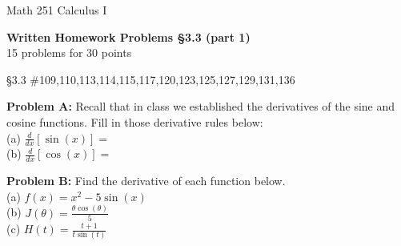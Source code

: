 \documentclass[11pt]{report}
\theoremstyle{plain}
\begin{document}
\hfill Math 251 Calculus I
\begin{center}
\Large{\textbf{Written Homework Problems \S 3.3 (part 1)}} \\
15 problems for 30 points\\
\end{center}

\begin{description}
\item{\S 3.3} \#109,110,113,114,115,117,120,123,125,127,129,131,136

\item{\textbf{Problem A: }} Recall that in class we established the derivatives of the sine and cosine functions. Fill in those derivative rules below:\\

(a) $\displaystyle{\frac{d}{dx} \left[ \sin (x) \right]=}$\\

(b) $\displaystyle{\frac{d}{dx} \left[ \cos (x) \right]=}$\\

\item{\textbf{Problem B: }} Find the derivative of each function below.\\

(a) $ f(x)=x^2 - 5 \sin(x)$\\

(b) $ J(\theta)=\frac{\theta\cos(\theta)}{5}$\\

(c) $H(t)=\frac{t+1}{t\sin(t)}$\\




\end{description}
\end{document}
